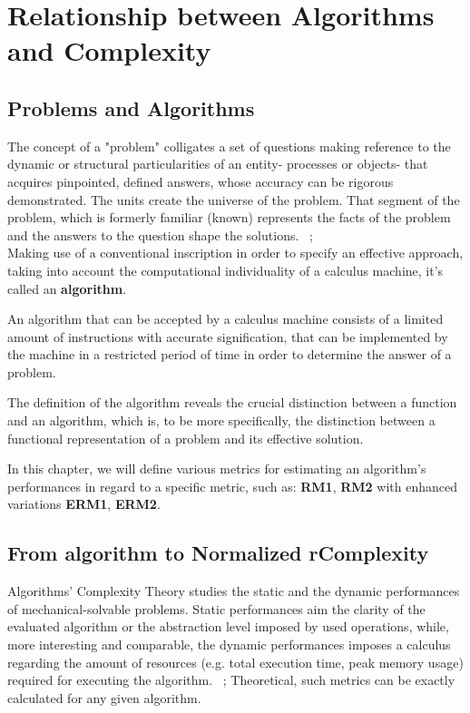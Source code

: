 \chapter{Relationship between Algorithms and Complexity}


\section{Problems and Algorithms}
The concept of a "problem" colligates a set of questions making reference to the dynamic or structural particularities of an entity- processes or objects- that acquires pinpointed, defined answers, whose accuracy can be rigorous demonstrated. The units create the universe of the problem. That segment of the problem, which is formerly familiar (known) represents the facts of the problem and the answers to the question shape the solutions. ~\cite{giumale2004introducere};
\\
Making use of a conventional inscription in order to specify an effective approach, taking into account the computational individuality of a calculus machine, it's called an \textbf{algorithm}.

An algorithm that can be accepted by a calculus machine consists of a limited amount of instructions with accurate signification, that can be implemented by the machine in a restricted period of time in order to determine the answer of a problem.

The definition of the algorithm reveals the crucial distinction between a function and an algorithm, which is, to be more specifically, the distinction between a functional representation of a problem and its effective solution. ~\cite{giumale2004introducere}

In this chapter, we will define various metrics for estimating an algorithm's performances in regard to a specific metric, such as: \textbf{RM1}, \textbf{RM2} with enhanced variations \textbf{ERM1}, \textbf{ERM2}.


\section{From algorithm to Normalized rComplexity}
Algorithms' Complexity Theory studies the static and the dynamic performances of mechanical-solvable problems. Static performances aim the clarity of the evaluated algorithm or the abstraction level imposed by used operations, while, more interesting and comparable, the dynamic performances imposes a calculus regarding the amount of resources (e.g. total execution time, peak memory usage) required for executing the algorithm. ~\cite{giumale2004introducere}; Theoretical, such metrics can be exactly calculated for any given algorithm.

